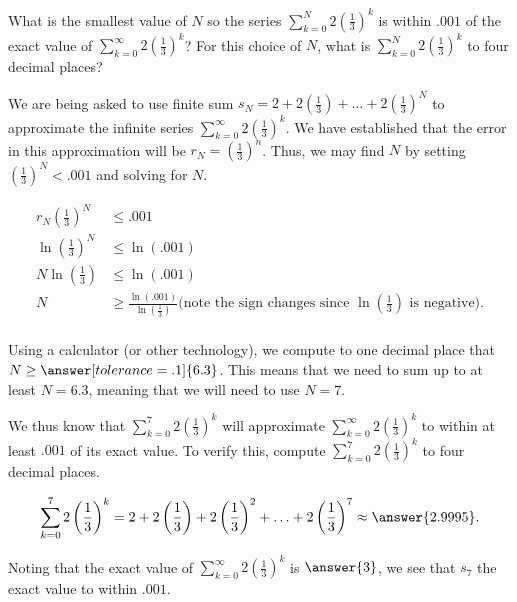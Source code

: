\documentclass{ximera}
\begin{document}
\begin{example}
What is the smallest value of $N$ so the series $\sum_{k=0}^{N} 2\left(\frac{1}{3}\right)^k$ is within $.001$ of the exact value of $\sum_{k=0}^{\infty} 2\left(\frac{1}{3}\right)^k$?  For this choice of $N$, what is $\sum_{k=0}^{N} 2\left(\frac{1}{3}\right)^k$ to four decimal places?

\begin{explanation}
We are being asked to use finite sum $s_N = 2+2\left(\frac{1}{3}\right)+\ldots + 2\left(\frac{1}{3}\right)^N$ to approximate the infinite series $\sum_{k=0}^{\infty} 2\left(\frac{1}{3}\right)^k$.   We have established that the error in this approximation will be $r_N = \left(\frac{1}{3}\right)^{n}$.  Thus, we may find $N$ by setting $\left(\frac{1}{3}\right)^{N} <.001$ and solving for $N$.

\begin{align*}
r_N  \left(\frac{1}{3}\right)^{N} &\leq .001 \\
\ln \left(\frac{1}{3}\right)^{N} &\leq \ln(.001) \\
N \ln \left(\frac{1}{3}\right) &\leq \ln(.001) \\
N &\geq \frac{\ln(.001)}{\ln \left(\frac{1}{3}\right)} \textrm{(note the sign changes since } \ln \left(\frac{1}{3}\right) \textrm{ is negative).}\\
\end{align*}

Using a calculator (or other technology), we compute to one decimal place that $N \geq \answer[tolerance=.1]{6.3}$.  This means that we need to sum up to at least $N=6.3$, meaning that we will need to use $N=7$.

We thus know that $\sum_{k=0}^7 2\left( \frac{1}{3}\right)^k$ will approximate $ \sum_{k=0}^\infty 2\left( \frac{1}{3}\right)^k$ to within at least $.001$ of its exact value.  To verify this, compute $\sum_{k=0}^7 2\left( \frac{1}{3}\right)^k$ to four decimal places.

\[
\sum_{k=0}^7 2\left(\frac{1}{3}\right)^k = 2+2\left(\frac{1}{3}\right)+2\left(\frac{1}{3}\right)^2+\ldots+ 2\left(\frac{1}{3}\right)^7 \approx \answer{2.9995}.
\]

Noting that the exact value of $\sum_{k=0}^\infty 2\left( \frac{1}{3}\right)^k$ is $\answer{3}$, we see that $s_7$  the exact value to within $.001$.
\end{explanation}
\end{example}
\end{document}
